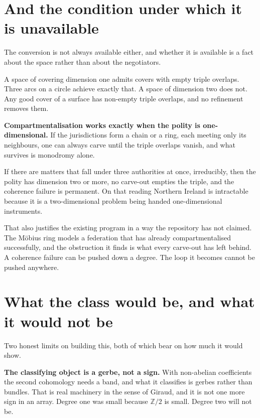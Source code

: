 \documentclass[11pt,a4paper]{article}
\begin{document}
\section{And the condition under which it is unavailable}

The conversion is not always available either, and whether it is available is a
fact about the space rather than about the negotiators.

A space of covering dimension one admits covers with empty triple overlaps.
Three arcs on a circle achieve exactly that. A space of dimension two does not.
Any good cover of a surface has non-empty triple overlaps, and no refinement
removes them.

\begin{sectionbox}
\textbf{Compartmentalisation works exactly when the polity is one-dimensional.}
If the jurisdictions form a chain or a ring, each meeting only its neighbours,
one can always carve until the triple overlaps vanish, and what survives is
monodromy alone.

If there are matters that fall under three authorities at once, irreducibly,
then the polity has dimension two or more, no carve-out empties the triple, and
the coherence failure is permanent. On that reading Northern Ireland is
intractable because it is a two-dimensional problem being handed
one-dimensional instruments.
\end{sectionbox}

That also justifies the existing program in a way the repository has not
claimed. The M\"obius ring models a federation that has already
compartmentalised successfully, and the obstruction it finds is what every
carve-out has left behind. A coherence failure can be pushed down a degree. The
loop it becomes cannot be pushed anywhere.

\section{What the class would be, and what it would not be}

Two honest limits on building this, both of which bear on how much it would
show.

\medskip
\textbf{The classifying object is a gerbe, not a sign.} With non-abelian
coefficients the second cohomology needs a band, and what it classifies is
gerbes rather than bundles. That is real machinery in the sense of Giraud, and
it is not one more sign in an array. Degree one was small because
$\mathbb{Z}/2$ is small. Degree two will not be.
\end{document}
